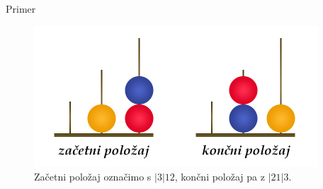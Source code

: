 \documentclass[dvipsnames]{beamer}
\DeclareMathOperator {\stopnja} {deg}
\begin{document}
%

\begin{frame}{Primer}
    \begin{figure}
        \centering
        \includegraphics[height=150pt]{../img/london-tower.png}
        \caption{Začetni položaj označimo s $|3|12$, končni položaj pa z $|21|3$.}
    \end{figure}
\end{frame}
\end{document}
